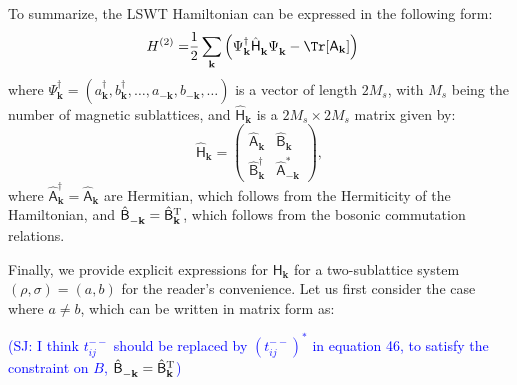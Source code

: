 To summarize, the LSWT Hamiltonian can be expressed in the following form:
\begin{align}
    H^{(2)} 
    = & \frac{1}{2}\sum_{\mathbf{k}} \Big(     
        \Psi_{\mathbf{k}}^\dagger \hat{\mathsf{H}}_{\mathbf{k}}^{\phantom{\dagger}} \Psi_{\mathbf{k}}^{\phantom{\dagger}} 
    - \Tr [\mathsf{A}_{\mathbf{k}}] \Big)
\end{align}
where $\Psi^\dagger_{\mathbf{k}}=\left( a^\dagger_{\mathbf{k}}, b^\dagger_{\mathbf{k}},\dots, a^{\phantom \dagger}_{-\mathbf{k}},b^{\phantom \dagger}_{-\mathbf{k}},\dots\right)$ is a vector of length $2 M_s$, with $M_s$ being the number of magnetic sublattices, and $\hat{\mathsf{H}}_{\mathbf{k}}$ is a $2M_s\times 2M_s$ matrix given by:
\begin{equation}
    \hat{\mathsf{H}}_{\mathbf{k}} = 
    \begin{pmatrix}
        \hat{\mathsf{A}}^{\phantom \dagger}_{\mathbf{k}} &  \hat{\mathsf{B}}^{\phantom \dagger}_{\mathbf{k}}\\[0.5ex] 
        \hat{\mathsf{B}}^\dagger_{\mathbf{k}}  & \hat{\mathsf{A}}^*_{-\mathbf{k}}
    \end{pmatrix},
\end{equation}
where $\hat{\mathsf{A}}^{\dagger}_{\mathbf{k}} = \hat{\mathsf{A}}^{\phantom \dagger}_{\mathbf{k}}$ are Hermitian, which follows from the Hermiticity of the Hamiltonian, and $\hat{\mathsf{B}}^{\phantom *}_{-\mathbf{k}} = \hat{\mathsf{B}}^{\rm T}_{\mathbf{k}}$, which follows from the bosonic commutation relations. 

Finally, we provide explicit expressions for $\mathsf{H}_{\mathbf{k}}$ for a two-sublattice system $(\rho, \sigma) = (a, b)$ for the reader's convenience.
Let us first consider the case where $a \neq b$, which can be written in matrix form as: 

\textcolor{blue}{(SJ: I think $t^{--}_{ij}$ should be replaced by $(t^{--}_{ij})^{*}$ in equation 46, to satisfy the constraint on $B$, $\hat{\mathsf{B}}^{\phantom *}_{-\mathbf{k}} = \hat{\mathsf{B}}^{\rm T}_{\mathbf{k}} $) }

